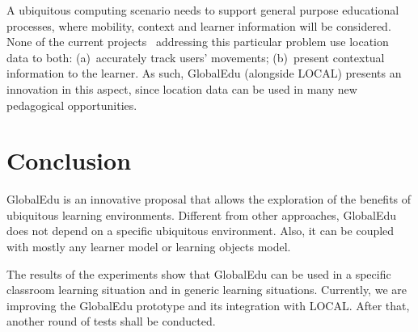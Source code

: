 \documentclass[5p,authoryear]{elsarticle}
\begin{document}
A ubiquitous computing scenario needs to support general purpose educational
processes, where mobility, context and learner information will be considered.
None of the current projects \citep{rogers05,ogata03} addressing this
particular problem use location data to both: (a)~accurately track users'
movements; (b)~present contextual information to the learner. As such,
GlobalEdu (alongside LOCAL) presents an innovation in this aspect, since
location data can be used in many new pedagogical opportunities.


\section{Conclusion} \label{sec:conclusion}

GlobalEdu is an innovative proposal that allows the exploration of the benefits
of ubiquitous learning environments. Different from other approaches, GlobalEdu
does not depend on a specific ubiquitous environment. Also, it can be coupled
with mostly any learner model or learning objects model. 

The results of the experiments show that GlobalEdu can be used in a specific
classroom learning situation and in generic learning situations. Currently, we
are improving the GlobalEdu prototype and its integration with LOCAL. After
that, another round of tests shall be conducted.

%
%
 

\end{document}
